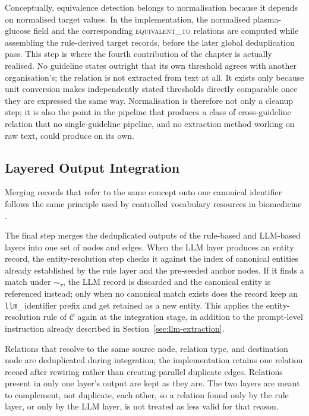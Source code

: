 Conceptually, equivalence detection belongs to normalisation because it depends on normalised target values. In the implementation, the normalised plasma-glucose field and the corresponding \textsc{equivalent\_to} relations are computed while assembling the rule-derived target records, before the later global deduplication pass. This step is where the fourth contribution of the chapter is actually realised. No guideline states outright that its own threshold agrees with another organisation's; the relation is not extracted from text at all. It exists only because unit conversion makes independently stated thresholds directly comparable once they are expressed the same way. Normalisation is therefore not only a cleanup step; it is also the point in the pipeline that produces a class of cross-guideline relation that no single-guideline pipeline, and no extraction method working on raw text, could produce on its own.

\subsection{Layered Output Integration}
\label{sec:integration}

Merging records that refer to the same concept onto one canonical identifier follows the same principle used by controlled vocabulary resources in biomedicine \cite{bodenreider2004}.

The final step merges the deduplicated outputs of the rule-based and LLM-based layers into one set of nodes and edges. When the LLM layer produces an entity record, the entity-resolution step checks it against the index of canonical entities already established by the rule layer and the pre-seeded anchor nodes. If it finds a match under $\sim_\tau$, the LLM record is discarded and the canonical entity is referenced instead; only when no canonical match exists does the record keep an \texttt{llm\_} identifier prefix and get retained as a new entity. This applies the entity-resolution rule of $\mathcal{C}$ again at the integration stage, in addition to the prompt-level instruction already described in Section~\ref{sec:llm-extraction}.

Relations that resolve to the same source node, relation type, and destination node are deduplicated during integration; the implementation retains one relation record after rewiring rather than creating parallel duplicate edges. Relations present in only one layer's output are kept as they are. The two layers are meant to complement, not duplicate, each other, so a relation found only by the rule layer, or only by the LLM layer, is not treated as less valid for that reason.

